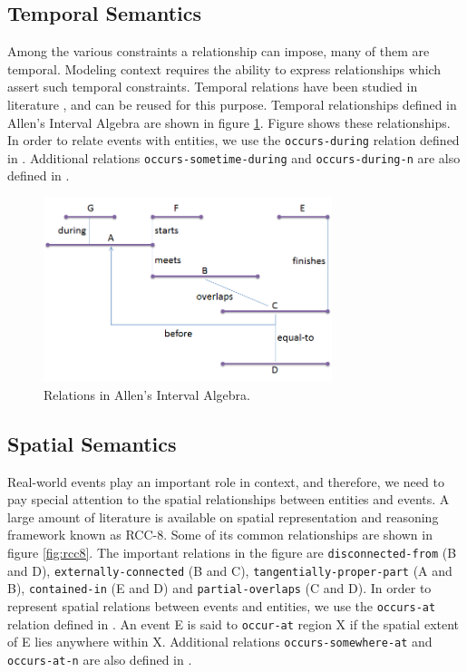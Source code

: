\subsection{Temporal Semantics}
Among the various constraints a relationship can impose, many of them are temporal. Modeling context requires the ability to express relationships which assert such temporal constraints. Temporal relations have been studied in literature \cite{allen1983maintaining, wolter2000spatio}, and can be reused for this purpose. Temporal relationships defined in Allen's Interval Algebra are shown in figure \ref{fig:allen}. Figure shows these relationships. In order to relate events with entities, we use the \texttt{occurs-during} relation defined in \cite{gupta2011managing}. Additional relations \texttt{occurs-sometime-during} and \texttt{occurs-during-n} are also defined in \cite{gupta2011managing}.

\begin{figure}[h]
\centering
\includegraphics[width=0.75\textwidth]{media/chapter2/allen.png}
\caption{Relations in Allen's Interval Algebra.}
\label{fig:allen}
\end{figure}

\subsection{Spatial Semantics}
Real-world events play an important role in context, and therefore, we need to pay special attention to the spatial relationships between entities and events. A large amount of literature is available on spatial representation and reasoning framework known as RCC-8. Some of its common relationships are shown in figure \ref{fig:rcc8}. The important relations in the figure are \texttt{disconnected-from} (B and D), \texttt{externally-connected} (B and C), \texttt{tangentially-proper-part} (A and B), \texttt{contained-in} (E and D) and \texttt{partial-overlaps} (C and D). In order to represent spatial relations between events and entities, we use the \texttt{occurs-at} relation defined in \cite{gupta2011managing}. An event E is said to \texttt{occur-at} region X if the spatial extent of E lies anywhere within X. Additional relations \texttt{occurs-somewhere-at} and \texttt{occurs-at-n} are also defined in \cite{gupta2011managing}.

